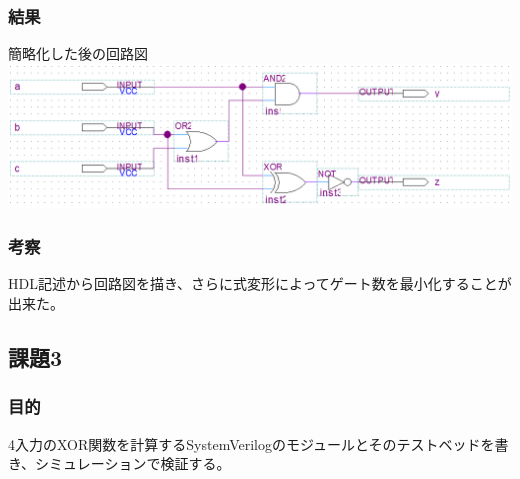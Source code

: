 \documentclass[a4paper]{jarticle}
\begin{document}
\subsubsection{結果}
\begin{center}
	簡略化した後の回路図
	\includegraphics[width=15cm]{2-l-2.PNG}
\end{center}
\subsubsection{考察}
HDL記述から回路図を描き、さらに式変形によってゲート数を最小化することが出来た。
\subsection{課題3}
\subsubsection{目的}
4入力のXOR関数を計算するSystemVerilogのモジュールとそのテストベッドを書き、シミュレーションで検証する。
\end{document}
